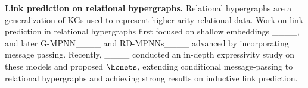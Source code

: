 \textbf{Link prediction on relational hypergraphs.} 
Relational hypergraphs 
are a generalization of KGs used to 
represent higher-arity relational data.
Work on link prediction in relational hypergraphs first focused on shallow embeddings
____, and later %
G-MPNN____ and RD-MPNNs____ %
advanced by  
incorporating message passing.
Recently, ____ conducted an in-depth expressivity study on these models and proposed $\hcnets$, extending conditional message-passing to relational hypergraphs and achieving strong results on inductive link prediction.